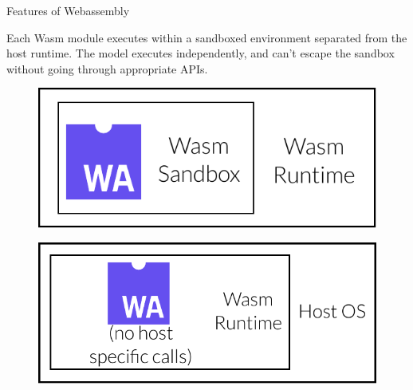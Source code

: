 \documentclass[final]{beamer}
\newlength{\colwidth}
\begin{document}
\begin{frame}[t]
\begin{columns}[t]
\begin{column}{\colwidth}
    
          \begin{block}{Features of Webassembly}
            \begin{minipage}[t]{.70\textwidth}
                \raggedright
                Each Wasm module executes within a sandboxed environment separated from the host runtime. The model executes independently, and can’t escape the sandbox without going through appropriate APIs.
            \end{minipage}%
            \begin{minipage}[t]{.30\textwidth}
            \vspace{-1em}
                \begin{figure}[t]
                \centering
                \includegraphics[width=\textwidth]{figures/security.pdf}
                \end{figure}
                \raggedleft
            \end{minipage}
            \begin{minipage}[t]{.30\textwidth}
            \vspace{-1em}
                \begin{figure}[t]
                \centering
                \includegraphics[width=\textwidth]{figures/portable.pdf}
                \end{figure}
                \raggedright
            \end{minipage}\hspace{0.05\textwidth}

\end{block}
\end{column}
\end{columns}
\end{frame}
\end{document}

